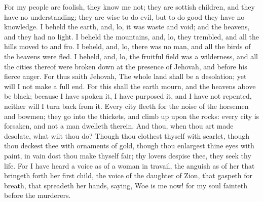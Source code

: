For my people are foolish, they know me not; they are sottish children, and they have no understanding; they are wise to do evil, but to do good they have no knowledge.  I beheld the earth, and, lo, it was waste and void; and the heavens, and they had no light. I beheld the mountains, and, lo, they trembled, and all the hills moved to and fro. I beheld, and, lo, there was no man, and all the birds of the heavens were fled. I beheld, and, lo, the fruitful field was a wilderness, and all the cities thereof were broken down at the presence of Jehovah, and before his fierce anger.  For thus saith Jehovah, The whole land shall be a desolation; yet will I not make a full end. For this shall the earth mourn, and the heavens above be black; because I have spoken it, I have purposed it, and I have not repented, neither will I turn back from it. Every city fleeth for the noise of the horsemen and bowmen; they go into the thickets, and climb up upon the rocks: every city is forsaken, and not a man dwelleth therein. And thou, when thou art made desolate, what wilt thou do? Though thou clothest thyself with scarlet, though thou deckest thee with ornaments of gold, though thou enlargest thine eyes with paint, in vain dost thou make thyself fair; thy lovers despise thee, they seek thy life. For I have heard a voice as of a woman in travail, the anguish as of her that bringeth forth her first child, the voice of the daughter of Zion, that gaspeth for breath, that spreadeth her hands, saying, Woe is me now! for my soul fainteth before the murderers. 

